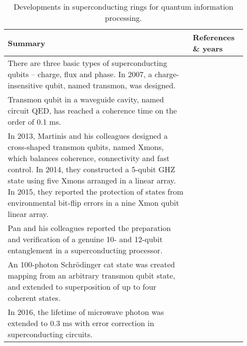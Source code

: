 \begin{table*}[!htbp]
	\begin{tabular}{|p{0.755\linewidth}|p{0.22\linewidth}|}
		\hline
	\textbf{Summary} & \textbf{References \& years} \\	\hline \hline
		There are three basic types of superconducting qubits -- charge, flux and phase. In 2007, a charge-insensitive qubit, named transmon, was designed.  &  \cite{bib:koch2007charge} \\
		\hline
		 Transmon qubit in a waveguide cavity, named circuit QED, has reached a coherence time on the order of 0.1 ms. & \cite{bib:paik2011observation, bib:rigetti2012superconducting} \\
		\hline
		In 2013, Martinis and his colleagues designed a cross-shaped transmon qubits, named Xmons, which balances coherence, connectivity and fast control. In 2014, they constructed a 5-qubit GHZ state using five Xmons arranged in a linear array. In 2015, they reported the protection of states from environmental bit-flip errors in a nine Xmon qubit linear array. &  \cite{bib:barends2013coherent, bib:barends2014superconducting, bib:kelly2015state} \\
		\hline
		Pan and his colleagues reported the preparation and verification of a genuine 10- and 12-qubit entanglement in a superconducting processor. & \cite{bib:gong2018genuine, bib:song201710} \\		
		\hline
		An 100-photon Schr{\"o}dinger cat state was created mapping from an arbitrary transmon qubit state, and extended to superposition of up to four coherent states. & \cite{bib:vlastakis2013deterministically} \\
		\hline
		In 2016, the lifetime of microwave photon was extended to 0.3 ms with error correction in superconducting circuits. &  \cite{bib:ofek2016extending} \\
		\hline
	\end{tabular}
	\captionspacetab \caption{Developments in superconducting rings for quantum information processing.} \label{tab:superconducting}
\end{table*}

